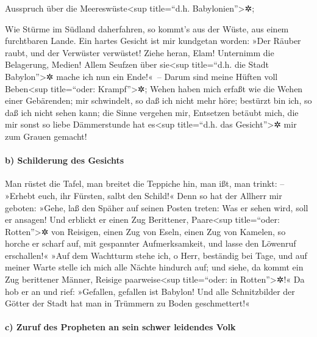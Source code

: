 Ausspruch über die Meereswüste\textless sup title=``d.h.
Babylonien''\textgreater✲;

Wie Stürme im Südland daherfahren, so kommt's aus der Wüste, aus einem
furchtbaren Lande. Ein hartes Gesicht ist mir kundgetan
worden: »Der Räuber raubt, und der Verwüster verwüstet! Ziehe heran,
Elam! Unternimm die Belagerung, Medien! Allem Seufzen über
sie\textless sup title=``d.h. die Stadt Babylon''\textgreater✲ mache ich
nun ein Ende!«~-- Darum sind meine Hüften voll
Beben\textless sup title=``oder: Krampf''\textgreater✲; Wehen haben mich
erfaßt wie die Wehen einer Gebärenden; mir schwindelt, so daß ich nicht
mehr höre; bestürzt bin ich, so daß ich nicht sehen kann;
die Sinne vergehen mir, Entsetzen betäubt mich, die mir
sonst so liebe Dämmerstunde hat es\textless sup title=``d.h. das
Gesicht''\textgreater✲ mir zum Grauen gemacht!

\hypertarget{b-schilderung-des-gesichts}{%
\paragraph{b) Schilderung des
Gesichts}\label{b-schilderung-des-gesichts}}

Man rüstet die Tafel, man breitet die Teppiche hin, man
ißt, man trinkt: -- »Erhebt euch, ihr Fürsten, salbt den Schild!«
Denn so hat der Allherr mir geboten: »Gehe, laß den Späher
auf seinen Posten treten: Was er sehen wird, soll er ansagen!
Und erblickt er einen Zug Berittener, Paare\textless sup
title=``oder: Rotten''\textgreater✲ von Reisigen, einen Zug von Eseln,
einen Zug von Kamelen, so horche er scharf auf, mit gespannter
Aufmerksamkeit, und lasse den Löwenruf erschallen!« »Auf
dem Wachtturm stehe ich, o Herr, beständig bei Tage, und auf meiner
Warte stelle ich mich alle Nächte hindurch auf; und siehe,
da kommt ein Zug berittener Männer, Reisige paarweise\textless sup
title=``oder: in Rotten''\textgreater✲!« Da hob er an und rief:
»Gefallen, gefallen ist Babylon! Und alle Schnitzbilder der Götter der
Stadt hat man in Trümmern zu Boden geschmettert!«

\hypertarget{c-zuruf-des-propheten-an-sein-schwer-leidendes-volk}{%
\paragraph{c) Zuruf des Propheten an sein schwer leidendes
Volk}\label{c-zuruf-des-propheten-an-sein-schwer-leidendes-volk}}

